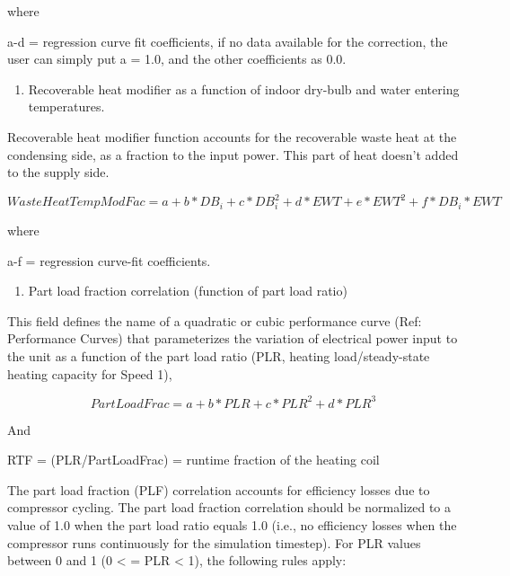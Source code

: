 where

a-d = regression curve fit coefficients, if no data available for the correction, the user can simply put a = 1.0, and the other coefficients as 0.0.

\begin{enumerate}
\def\labelenumi{\arabic{enumi})}
\setcounter{enumi}{6}
\tightlist
\item
  Recoverable heat modifier as a function of indoor dry-bulb and water entering temperatures.
\end{enumerate}

Recoverable heat modifier function accounts for the recoverable waste heat at the condensing side, as a fraction to the input power. This part of heat doesn't added to the supply side.

\begin{equation}
WasteHeatTempModFac = a + b*D{B_i} + c*DB_i^2 + d*EWT + e*EW{T^2} + f*D{B_i}*EWT
\end{equation}

where

a-f = regression curve-fit coefficients.

\begin{enumerate}
\def\labelenumi{\arabic{enumi})}
\setcounter{enumi}{7}
\tightlist
\item
  Part load fraction correlation (function of part load ratio)
\end{enumerate}

This field defines the name of a quadratic or cubic performance curve (Ref: Performance Curves) that parameterizes the variation of electrical power input to the unit as a function of the part load ratio (PLR, heating load/steady-state heating capacity for Speed 1),

\begin{equation}
PartLoadFrac = a + b*PLR + c*PL{R^2} + d*PL{R^3}
\end{equation}

And

RTF = (PLR/PartLoadFrac) = runtime fraction of the heating coil

The part load fraction (PLF) correlation accounts for efficiency losses due to compressor cycling. The part load fraction correlation should be normalized to a value of 1.0 when the part load ratio equals 1.0 (i.e., no efficiency losses when the compressor runs continuously for the simulation timestep). For PLR values between 0 and 1 (0 \textless{} = PLR \textless{} 1), the following rules apply:

